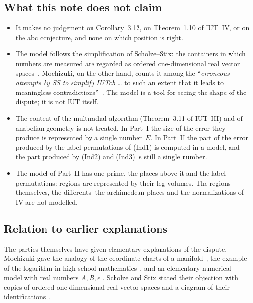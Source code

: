 \documentclass[11pt,a4paper]{article}
\newcommand{\q}[1]{``#1''}
\theoremstyle{plain}
\theoremstyle{definition}
\theoremstyle{remark}
\begin{document}
\subsection{What this note does not claim}
\begin{itemize}
\item It makes no judgement on Corollary~3.12, on Theorem~1.10 of IUT~IV, or on the abc conjecture, and none on which
position is right.
\item The model follows the simplification of Scholze--Stix: the containers in which numbers are measured are regarded as
ordered one-dimensional real vector spaces~\cite[\S2.1.4]{SS}. Mochizuki, on the other hand, counts it
among the \q{\emph{erroneous attempts by SS to simplify IUTch} \dots{} to such an extent that it leads to meaningless
contradictions}~\cite[\S4]{R18}. The model is a tool for seeing the shape of
the dispute; it is not IUT itself.
\item The content of the multiradial algorithm (Theorem~3.11 of IUT~III) and of anabelian geometry is not treated. In
Part~I the size of the error they produce is represented by a single number~$E$. In Part~II the part of the error
produced by the label permutations of (Ind1) is computed in a model, and the part produced by (Ind2) and (Ind3) is still
a single number.
\item The model of Part~II has one prime, the places above it and the label permutations; regions are represented by
their log-volumes. The regions themselves, the differents, the archimedean places and the normalizations of IV are not
modelled.
\end{itemize}

\subsection{Relation to earlier explanations}\label{ss:earlier}
The parties themselves have given elementary explanations of the dispute. Mochizuki gave the analogy of the
coordinate charts of a manifold~\cite[(LbEx5)]{R18}, the example of the logarithm in high-school
mathematics~\cite[\S3.11~(ii)]{Alien}, and an elementary numerical model with real numbers $A,B,\epsilon$
\cite[Example~3.11.4]{Alien}. Scholze and Stix stated their objection with copies of ordered one-dimensional real vector
spaces and a diagram of their identifications~\cite[\S2.2]{SS}.
\end{document}
